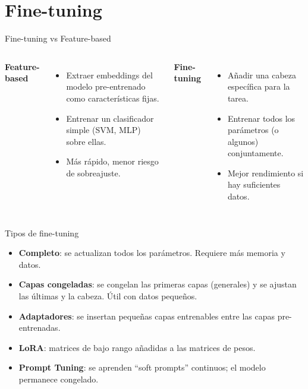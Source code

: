 \documentclass[aspectratio=169, 10pt, xcolor=table]{beamer}
\begin{document}
\section{Fine-tuning}

\begin{frame}{Fine-tuning vs Feature-based}
    \begin{columns}[t]
        \textbf{Feature-based}
        \begin{itemize}
            \item Extraer embeddings del modelo pre-entrenado como características fijas.
            \item Entrenar un clasificador simple (SVM, MLP) sobre ellas.
            \item Más rápido, menor riesgo de sobreajuste.
        \end{itemize}
        \textbf{Fine-tuning}
        \begin{itemize}
            \item Añadir una cabeza específica para la tarea.
            \item Entrenar todos los parámetros (o algunos) conjuntamente.
            \item Mejor rendimiento si hay suficientes datos.
        \end{itemize}
    \end{columns}
\end{frame}

\begin{frame}{Tipos de fine-tuning}
    \begin{itemize}
        \item \textbf{Completo}: se actualizan todos los parámetros. Requiere más memoria y datos.
        \item \textbf{Capas congeladas}: se congelan las primeras capas (generales) y se ajustan las últimas y la cabeza. Útil con datos pequeños.
        \item \textbf{Adaptadores}: se insertan pequeñas capas entrenables entre las capas pre-entrenadas.
        \item \textbf{LoRA}: matrices de bajo rango añadidas a las matrices de pesos.
        \item \textbf{Prompt Tuning}: se aprenden ``soft prompts'' continuos; el modelo permanece congelado.
    \end{itemize}
\end{frame}
\end{document}
